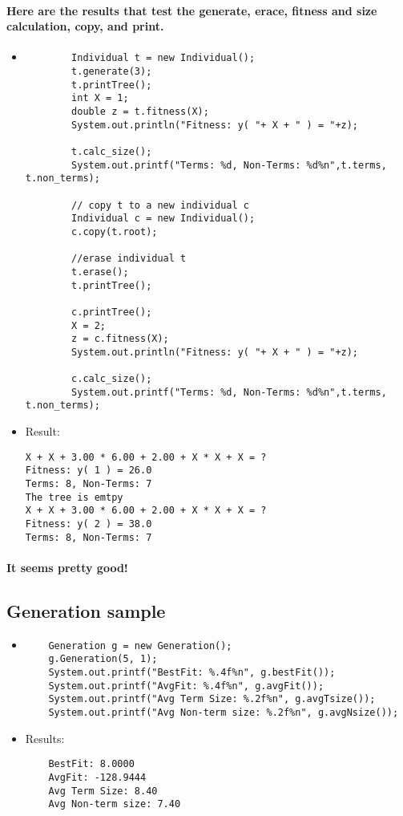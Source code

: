 \documentclass[12pt]{article}
\begin{document}
	\paragraph{Here are the results that test the generate, erace, fitness and size calculation, copy, and print.}
	\begin{itemize}
	\item
	\begin{lstlisting}
        Individual t = new Individual();
        t.generate(3);
        t.printTree();
        int X = 1;
        double z = t.fitness(X);
        System.out.println("Fitness: y( "+ X + " ) = "+z);
        
        t.calc_size();
        System.out.printf("Terms: %d, Non-Terms: %d%n",t.terms, t.non_terms);
        
        // copy t to a new individual c
        Individual c = new Individual();
        c.copy(t.root);
        
        //erase individual t
        t.erase();
        t.printTree();
        
        c.printTree();
        X = 2;
        z = c.fitness(X);
        System.out.println("Fitness: y( "+ X + " ) = "+z);
        
        c.calc_size();
        System.out.printf("Terms: %d, Non-Terms: %d%n",t.terms, t.non_terms);
	\end{lstlisting}
	
	\item Result:
	\begin{lstlisting}
X + X + 3.00 * 6.00 + 2.00 + X * X + X = ?
Fitness: y( 1 ) = 26.0
Terms: 8, Non-Terms: 7
The tree is emtpy
X + X + 3.00 * 6.00 + 2.00 + X * X + X = ?
Fitness: y( 2 ) = 38.0
Terms: 8, Non-Terms: 7
	\end{lstlisting}
	\end{itemize}
	
	\paragraph{It seems pretty good!}

	\subsection{Generation sample}
	\begin{itemize}
	\item
	\begin{lstlisting}
    Generation g = new Generation();
    g.Generation(5, 1);
    System.out.printf("BestFit: %.4f%n", g.bestFit());
    System.out.printf("AvgFit: %.4f%n", g.avgFit());
    System.out.printf("Avg Term Size: %.2f%n", g.avgTsize());
    System.out.printf("Avg Non-term size: %.2f%n", g.avgNsize());
	\end{lstlisting}
	\item Results:
	\begin{lstlisting}
    BestFit: 8.0000
    AvgFit: -128.9444
    Avg Term Size: 8.40
    Avg Non-term size: 7.40
	\end{lstlisting}
	\end{itemize}
	
\end{document}
